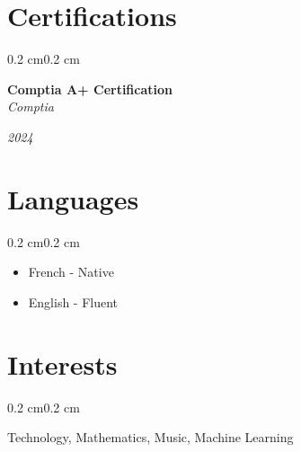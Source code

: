 \documentclass[10pt, letterpaper]{article}
\newenvironment{highlights}{%
    \begin{itemize}[
        topsep=0.10 cm,%
        parsep=0.10 cm,%
        partopsep=0pt,%
        itemsep=0pt,%
        leftmargin=0.4 cm + 10pt%
    ]
}{%
    \end{itemize}%
}
\newenvironment{onecolentry}{%
    \begin{adjustwidth}{0.2 cm}{0.2 cm}%
}{%
    \end{adjustwidth}%
}
\newenvironment{twocolentry}[1]{%
    \begin{onecolentry}%
    \def\twocolentryarg{#1}%
    \noindent
    \begin{minipage}[t]{0.68\textwidth} %
}{%
    \end{minipage}\hfill%
    \begin{minipage}[t]{0.30\textwidth} %
      \raggedleft\twocolentryarg
    \end{minipage}%
    \vspace{0.2cm}%
    \end{onecolentry}%
}
\begin{document}
\section{Certifications}
\begin{twocolentry}{\textit{2024}}
    \textbf{Comptia A+ Certification }\\
    \textit{Comptia }
\end{twocolentry}
\vspace{0.10 cm}

\section{Languages}
\begin{onecolentry}
    \begin{highlights}
        \item French - Native
        \item English - Fluent
    \end{highlights}
\end{onecolentry}

\section{Interests}
\begin{onecolentry}
    Technology, Mathematics, Music, Machine Learning
\end{onecolentry}
\end{document}
